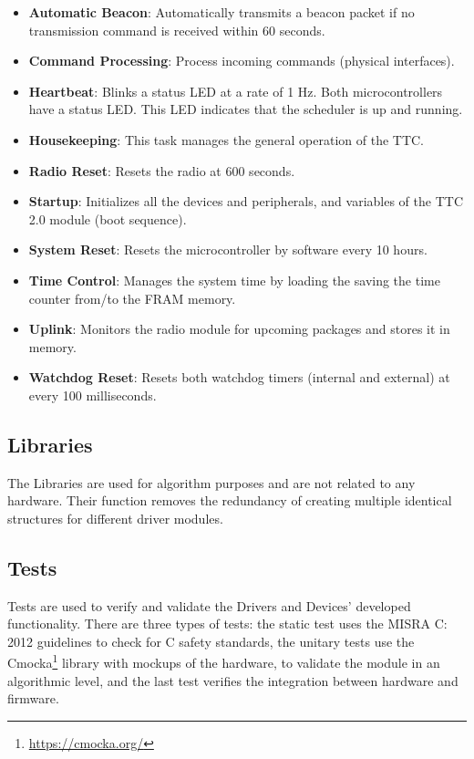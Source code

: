 \begin{itemize}
    \item \textbf{Automatic Beacon}: Automatically transmits a beacon packet if no transmission command is received within 60 seconds.
    \item \textbf{Command Processing}: Process incoming commands (physical interfaces).
    \item \textbf{Heartbeat}: Blinks a status LED at a rate of 1 Hz. Both microcontrollers have a status LED. This LED indicates that the scheduler is up and running.
    \item \textbf{Housekeeping}: This task manages the general operation of the TTC.
    \item \textbf{Radio Reset}: Resets the radio at 600 seconds.
    \item \textbf{Startup}: Initializes all the devices and peripherals, and variables of the TTC 2.0 module (boot sequence).
    \item \textbf{System Reset}: Resets the microcontroller by software every 10 hours.
    \item \textbf{Time Control}: Manages the system time by loading the saving the time counter from/to the FRAM memory.
    \item \textbf{Uplink}: Monitors the radio module for upcoming packages and stores it in memory.
    \item \textbf{Watchdog Reset}: Resets both watchdog timers (internal and external) at every 100 milliseconds.
\end{itemize}

\subsection{Libraries}

The Libraries are used for algorithm purposes and are not related to any hardware. Their function removes the redundancy of creating multiple identical structures for different driver modules.

\subsection{Tests}

Tests are used to verify and validate the Drivers and Devices' developed functionality. There are three types of tests: the static test uses the MISRA C: 2012 \cite{misrac2012} guidelines to check for C safety standards, the unitary tests use the Cmocka\footnote{\href{https://cmocka.org/}{https://cmocka.org/}} library with mockups of the hardware, to validate the module in an algorithmic level, and the last test verifies the integration between hardware and firmware.
